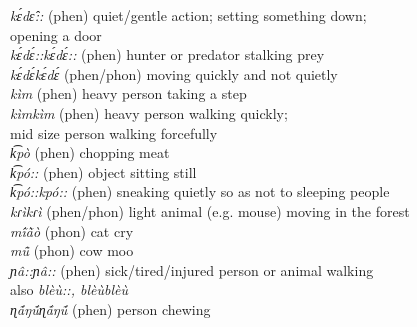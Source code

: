 \documentclass[output=paper,colorlinks,citecolor=brown]{langscibook}
\begin{document}
\begin{tabbing}
\textit{kɛ́dɛ̂::}                             \>(phen) quiet/gentle action; setting something down; \\
\> opening a door                             \\
\textit{kɛ́dɛ́::kɛ́dɛ́::}                       \>(phen) hunter or predator stalking prey                                                                 \\
\textit{kɛ́dɛ́kɛ́dɛ́}                         \>(phen/phon) moving quickly and not quietly                                                              \\
\textit{kìm}                                 \>(phen) heavy person taking a step                                                                            \\
\textit{kìmkìm}                             \>(phen) heavy person walking quickly; \\
\> mid size person walking forcefully                                       \\
\textit{k͡pò}                                \>(phen) chopping meat                                                                                    \\
\textit{k͡pó::}                               \>(phen) object sitting still                                                                             \\
\textit{k͡pó::kpó::}                          \>(phen) sneaking quietly so as not to sleeping people                                                    \\
\textit{kɾìkɾì}                             \>(phen/phon) light animal (e.g. mouse) moving in the forest                                           \\
\textit{mĩ́ã̀ò}                            \>(phon) cat cry                                                                                          \\
\textit{mũ̂}                              \>(phon) cow moo                                                                                          \\
\textit{ɲâ::ɲâ::} \>(phen) sick/tired/injured person or animal walking \\
\> also \textit{blèù::, blèùblèù}\\
\textit{ɳã́ŋṹɳã́ŋṹ}                     \>(phen) person chewing                                                                                   \\

\end{tabbing}
\end{document}
